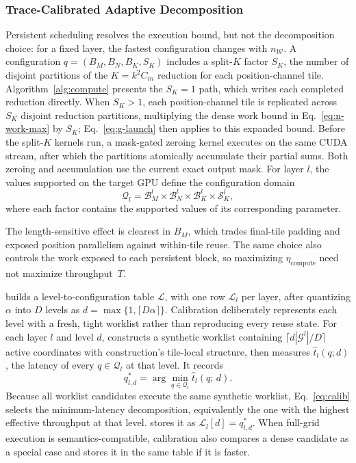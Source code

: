 \subsubsection{Trace-Calibrated Adaptive Decomposition}
\label{sec:design:adaptive}

Persistent scheduling resolves the execution bound, but not the decomposition
choice: for a fixed layer, the fastest configuration changes with
$n_{\mathcal{W}}$. A configuration $q=(B_M,B_N,B_K,S_K)$ includes a split-$K$
factor $S_K$, the number of disjoint partitions of the $K=k^2C_{in}$ reduction
for each position-channel tile. Algorithm~\ref{alg:compute} presents the
$S_K=1$ path, which writes each completed reduction directly. When $S_K>1$,
each position-channel tile is replicated across $S_K$ disjoint reduction
partitions, multiplying the dense work bound in Eq.~\ref{eq:n-work-max} by
$S_K$; Eq.~\ref{eq:g-launch} then applies to this expanded bound. Before the
split-$K$ kernels run, a mask-gated zeroing kernel executes on the same CUDA
stream, after which the partitions atomically accumulate their partial sums.
Both zeroing and accumulation use the current exact output mask.
For layer $l$, the values supported on the target GPU
define the configuration domain
\begin{equation*}
  \mathcal{Q}_l = \mathcal{B}^l_M \times \mathcal{B}^l_N
  \times \mathcal{B}^l_K \times \mathcal{S}^l_K ,
\end{equation*}
where each factor contains the supported values of its corresponding
parameter.

The length-sensitive effect is clearest in $B_M$, which trades final-tile
padding and exposed position parallelism against within-tile reuse. The same
choice also controls the work exposed to each persistent block, so maximizing
$\eta_{\mathrm{compute}}$ need not maximize throughput~$T$.

\sysname builds a level-to-configuration table $\mathcal{L}$, with one row
$\mathcal{L}_l$ per layer, after quantizing $\alpha$ into $D$ levels as
$d=\max\{1,\lceil D\alpha\rceil\}$. Calibration deliberately represents each
level with a fresh, tight worklist rather than reproducing every reuse state.
For each layer $l$ and level $d$, \sysname
constructs a synthetic worklist containing
$\lceil d|\mathcal{G}^l|/D\rceil$ active coordinates with construction's
tile-local structure, then measures $\widehat{t}_l(q;d)$, the latency of every
$q\in\mathcal{Q}_l$ at that level. It records
\begin{equation}
  q^*_{l,d} = \arg\min_{q\in\mathcal{Q}_l}
  \widehat{t}_l(q;\,d) .
  \label{eq:calib}
\end{equation}
Because all worklist candidates execute the same synthetic worklist,
Eq.~\ref{eq:calib} selects the minimum-latency decomposition, equivalently the
one with the highest effective throughput at that level. \sysname stores it as
$\mathcal{L}_l[d]=q^*_{l,d}$.
When full-grid execution is semantics-compatible, calibration also compares a
dense candidate as a special case and stores it in the same table if it is
faster.

